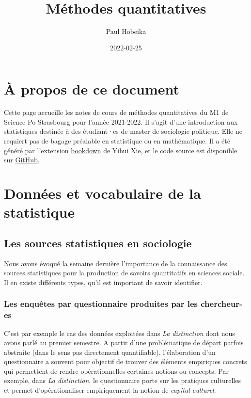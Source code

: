 \documentclass[
]{book}
\title{Méthodes quantitatives}
\author{Paul Hobeika}
\date{2022-02-25}
\begin{document}
\maketitle

{
\setcounter{tocdepth}{1}
\tableofcontents
}
\hypertarget{uxe0-propos-de-ce-document}{%
\chapter*{À propos de ce document}\label{uxe0-propos-de-ce-document}}

Cette page accueille les notes de cours de méthodes quantitatives du M1 de Science Po Strasbourg pour l'année 2021-2022. Il s'agit d'une introduction aux statistiques destinée à des étudiant·es de master de sociologie politique. Elle ne requiert pas de bagage préalable en statistique ou en mathématique. Il a été généré par l'extension \href{https://bookdown.org/}{bookdown} de Yihui Xie, et le code source est disponible sur \href{https://github.com/phobeika/quanti}{GitHub}.

\hypertarget{donnuxe9es-et-vocabulaire-de-la-statistique}{%
\chapter{Données et vocabulaire de la statistique}\label{donnuxe9es-et-vocabulaire-de-la-statistique}}

\hypertarget{les-sources-statistiques-en-sociologie}{%
\section{Les sources statistiques en sociologie}\label{les-sources-statistiques-en-sociologie}}

Nous avons évoqué la semaine dernière l'importance de la connaissance des sources statistiques pour la production de savoirs quantitatifs en sciences sociale. Il en existe différents types, qu'il est important de savoir identifier.

\hypertarget{les-enquuxeates-par-questionnaire-produites-par-les-chercheur-es}{%
\subsection{Les enquêtes par questionnaire produites par les chercheur-es}\label{les-enquuxeates-par-questionnaire-produites-par-les-chercheur-es}}

C'est par exemple le cas des données exploitées dans \emph{La distinction} \citep{bourdieu1979} dont nous avons parlé au premier semestre. A partir d'une problématique de départ parfois abstraite (dans le sens pas directement quantifiable), l'élaboration d'un questionnaire a souvent pour objectif de trouver des éléments empiriques concrets qui permettent de rendre opérationnelles certaines notions ou concepts. Par exemple, dans \emph{La distinction}, le questionnaire porte sur les pratiques culturelles et permet d'opérationaliser empiriquement la notion de \emph{capital culturel}.
\end{document}
